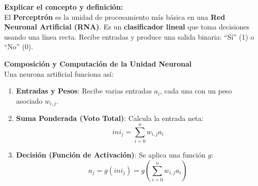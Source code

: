 \documentclass[letterpaper,12pt]{article}
\begin{document}
\begin{itemize}
\begin{center}
    \end{center}
    
    \textbf{Explicar el concepto y definición:}
    \\
    
El \textbf{Perceptrón} es la unidad de procesamiento más básica en una \textbf{Red Neuronal Artificial (RNA)}.  
Es un \textbf{clasificador lineal} que toma decisiones usando una línea recta.  
Recibe entradas y produce una salida binaria: “Sí” (1) o “No” (0).

\vspace{0.1cm}
\textbf{Composición y Computación de la Unidad Neuronal}
\\

Una neurona artificial funciona así:

\begin{enumerate}
    \item \textbf{Entradas y Pesos}: Recibe varias entradas $a_i$, cada una con un peso asociado $w_{i,j}$.

    \item \textbf{Suma Ponderada (Voto Total)}: Calcula la entrada neta:
    \[
        ini_j = \sum_{i=0}^{n} w_{i,j} a_i
    \]

    \item \textbf{Decisión (Función de Activación)}: Se aplica una función $g$:
    \[
        a_j = g(ini_j) = g\left( \sum_{i=0}^{n} w_{i,j} a_i \right)
    \]
\end{enumerate}


\end{itemize}
\end{document}
